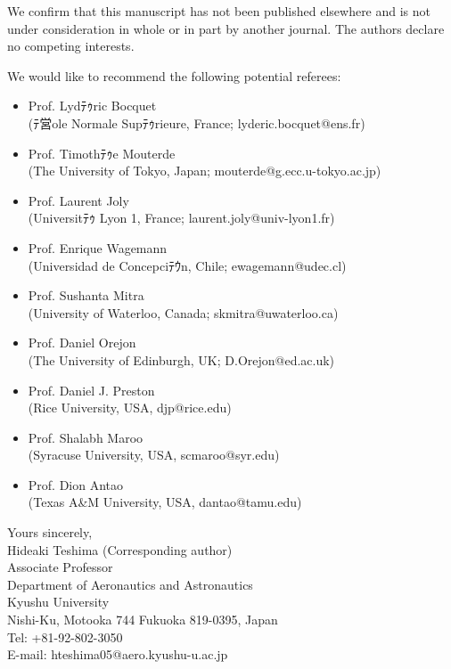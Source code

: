 ﻿\documentclass{article}
\begin{document}
We confirm that this manuscript has not been published elsewhere and is not under consideration in whole or in part by another journal. The authors declare no competing interests.

We would like to recommend the following potential referees: 
\begin{itemize}
\item Prof. Lydﾃｩric Bocquet\\
(ﾃ営ole Normale Supﾃｩrieure, France; lyderic.bocquet@ens.fr) 
\item Prof. Timothﾃｩe Mouterde\\
(The University of Tokyo, Japan; mouterde@g.ecc.u-tokyo.ac.jp) 
\item Prof. Laurent Joly\\
(Universitﾃｩ Lyon 1, France; laurent.joly@univ-lyon1.fr)
\item Prof. Enrique Wagemann\\
(Universidad de Concepciﾃｳn, Chile; ewagemann@udec.cl)
\item Prof. Sushanta Mitra\\
(University of Waterloo, Canada; skmitra@uwaterloo.ca)
\item Prof. Daniel Orejon\\
(The University of Edinburgh, UK; D.Orejon@ed.ac.uk)
\item Prof. Daniel J. Preston\\
(Rice University, USA, djp@rice.edu)
\item Prof. Shalabh Maroo\\
(Syracuse University, USA, scmaroo@syr.edu)
\item Prof. Dion Antao\\
(Texas A\&M University, USA, dantao@tamu.edu)
\end{itemize}

Yours sincerely,\\
Hideaki Teshima (Corresponding author)\\
Associate Professor\\
Department of Aeronautics and Astronautics\\
Kyushu University\\
Nishi-Ku, Motooka 744 Fukuoka 819-0395, Japan\\
Tel: +81-92-802-3050\\
E-mail: hteshima05@aero.kyushu-u.ac.jp
\end{document}

